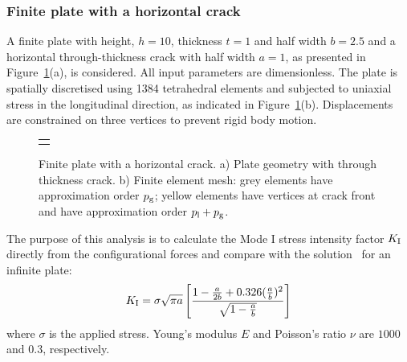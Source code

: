 \documentclass[onecolumn]{svjour3}
\begin{document}
\subsubsection{Finite plate with a horizontal crack}\label{sec:plate_section}
A finite plate with height, $h = 10$, thickness $t=1$ and half width $b = 2.5$ and a horizontal through-thickness crack with half width $a = 1$, as presented in Figure~\ref{fig:plate_load_mesh}(a), is considered. All input parameters are dimensionless. 
The  plate is spatially discretised using 1384 tetrahedral elements and subjected to uniaxial stress in the longitudinal direction, as indicated in Figure~\ref{fig:plate_load_mesh}(b). 
Displacements are constrained on three vertices to prevent rigid body motion. 

\begin{figure}[h!]
\begin{center}
\begin{tabular}{c}
{\def\svgwidth{8cm} }\\
\end{tabular}
\caption{Finite plate with a horizontal crack. a) Plate geometry with through thickness crack. b) Finite element mesh: grey elements have approximation order $p_{\rm g}$; yellow elements have vertices at crack front and have approximation order $p_{\rm l}+p_{\rm g}$. }
\label{fig:plate_load_mesh}
\end{center}
\end{figure}

The purpose of this analysis is to calculate the Mode I stress intensity factor $ K_{\rm I} $ directly from the configurational forces and compare with the solution~\cite{rooke1976compendium} for an infinite plate:
\begin{equation}\label{eq:frac_analytical}
K_{\rm I}=\sigma \sqrt{\pi a} \left[  \frac{1 - \frac{a}{2b} + 0.326 (\frac{a}{b})^2 }{\sqrt{1-\frac{a}{b}}}  \right]
\end{equation}
where $\sigma $ is the applied stress. 
Young's modulus $E$ and Poisson's ratio $\nu$ are $1000$ and $0.3$, respectively. 
\end{document}
